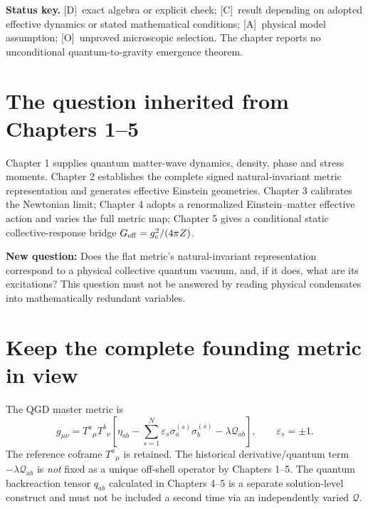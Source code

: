 \documentclass[11pt,a4paper]{article}
\theoremstyle{definition}\newtheorem{definition}[theorem]{Definition}
\theoremstyle{remark}\newtheorem{remark}[theorem]{Remark}
\newcommand{\Dtag}{\textsf{[D]}}
\newcommand{\Atag}{\textsf{[A]}}
\newcommand{\Ctag}{\textsf{[C]}}
\newcommand{\Otag}{\textsf{[O]}}
\begin{document}
\textbf{Status key.} \Dtag\ exact algebra or explicit check; \Ctag\ result depending on adopted effective dynamics or stated mathematical conditions; \Atag\ physical model assumption; \Otag\ unproved microscopic selection. The chapter reports no unconditional quantum-to-gravity emergence theorem.
\tableofcontents
\section{The question inherited from Chapters 1--5}
Chapter 1 supplies quantum matter-wave dynamics, density, phase and stress moments. Chapter 2 establishes the complete signed natural-invariant metric representation and generates effective Einstein geometries. Chapter 3 calibrates the Newtonian limit; Chapter 4 adopts a renormalized Einstein--matter effective action and varies the full metric map; Chapter 5 gives a conditional static collective-response bridge $G_{\rm eff}=g_c^2/(4\pi Z)$.

\textbf{New question:} Does the flat metric's natural-invariant representation correspond to a physical collective quantum vacuum, and, if it does, what are its excitations? This question must not be answered by reading physical condensates into mathematically redundant variables.

\section{Keep the complete founding metric in view}
The QGD master metric is
\begin{equation}\label{eq:fullmetric}
\boxed{g_{\mu\nu}=T^a{}_{\mu}T^b{}_{\nu}
\left[\eta_{ab}-\sum_{s=1}^N\varepsilon_s\sigma_a^{(s)}\sigma_b^{(s)}-\lambda\mathcal Q_{ab}\right],\qquad\varepsilon_s=\pm1.}
\end{equation}
The reference coframe $T^a{}_{\mu}$ is retained. The historical derivative/quantum term $-\lambda\mathcal Q_{ab}$ is \emph{not} fixed as a unique off-shell operator by Chapters 1--5. The quantum backreaction tensor $q_{ab}$ calculated in Chapters 4--5 is a separate solution-level construct and must not be included a second time via an independently varied $\mathcal Q$.
\end{document}

